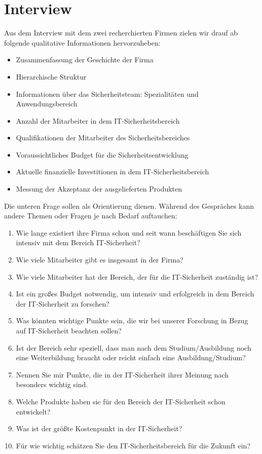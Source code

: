 \section{Interview}\label{appendix:interview}

Aus dem Interview mit dem zwei recherchierten Firmen zielen wir drauf ab folgende qualitative Informationen hervorzuheben:

\begin{itemize}
    \item Zusammenfassung der Geschichte der Firma
    \item Hierarchische Struktur
    \item Informationen über das Sicherheitsteam: Spezialitäten und Anwendungsbereich
    \item Anzahl der Mitarbeiter in dem IT-Sicherheitsbereich
    \item Qualifikationen der Mitarbeiter des Sicherheitsbereiches
    \item Voraussichtliches Budget für die Sicherheitsentwicklung
    \item Aktuelle finanzielle Investitionen in dem IT-Sicherheitsbereich
    \item Messung der Akzeptanz der ausgelieferten Produkten
\end{itemize}

Die unteren Frage sollen als Orientierung dienen. Während des Gespräches kann andere Themen oder Fragen je nach Bedarf
auftauchen:

\begin{enumerate}
    \item Wie lange existiert ihre Firma schon und seit wann beschäftigen Sie sich intensiv mit dem Bereich IT-Sicherheit?
    \item Wie viele Mitarbeiter gibt es insgesamt in der Firma?
    \item Wie viele Mitarbeiter hat der Bereich, der für die IT-Sicherheit zuständig ist?
    \item Ist ein großes Budget notwendig, um intensiv und erfolgreich in dem Bereich der IT-Sicherheit zu forschen?
    \item Was könnten wichtige Punkte sein, die wir bei unserer Forschung in Bezug auf IT-Sicherheit beachten sollen?
    \item Ist der Bereich sehr speziell, dass man nach dem Studium/Ausbildung noch eine Weiterbildung braucht oder 
    reicht einfach eine Ausbildung/Studium?
    \item Nennen Sie mir Punkte, die in der IT-Sicherheit ihrer Meinung nach besonders wichtig sind.
    \item Welche Produkte haben sie für den Bereich der IT-Sicherheit schon entwickelt?
    \item Was ist der größte Kostenpunkt in der IT-Sicherheit?
    \item Für wie wichtig schätzen Sie den IT-Sicherheitsbereich für die Zukunft ein?
\end{enumerate}
